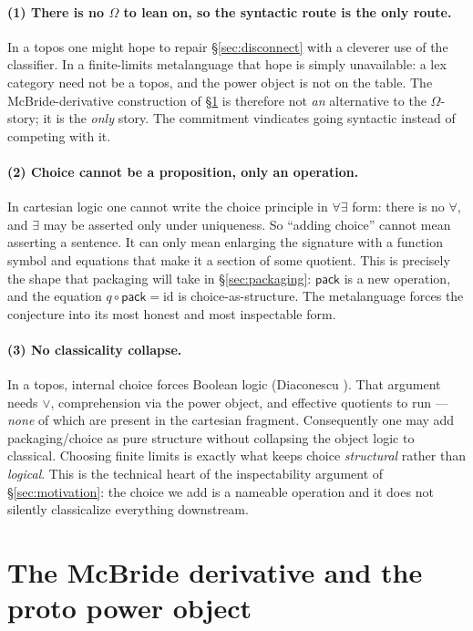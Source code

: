 \documentclass[11pt]{article}
\theoremstyle{definition}
\theoremstyle{plain}
\newcommand{\pack}{\mathsf{pack}}
\newcommand{\id}{\mathrm{id}}
\newcommand{\qmap}{q}
\begin{document}
\paragraph{(1) There is no $\Omega$ to lean on, so the syntactic route is the
only route.} In a topos one might hope to repair \S\ref{sec:disconnect} with a
cleverer use of the classifier. In a finite-limits metalanguage that hope is
simply unavailable: a lex category need not be a topos, and the power object
is not on the table. The McBride-derivative construction of
\S\ref{sec:derivative} is therefore not \emph{an} alternative to the
$\Omega$-story; it is the \emph{only} story. The commitment vindicates going
syntactic instead of competing with it.

\paragraph{(2) Choice cannot be a proposition, only an operation.} In
cartesian logic one cannot write the choice principle in $\forall\exists$
form: there is no $\forall$, and $\exists$ may be asserted only under
uniqueness. So ``adding choice'' cannot mean asserting a sentence. It can only
mean enlarging the signature with a function symbol and equations that make it
a section of some quotient. This is precisely the shape that packaging will
take in \S\ref{sec:packaging}: $\pack$ is a new operation, and the equation
$\qmap \circ \pack = \id$ is choice-as-structure. The metalanguage forces the
conjecture into its most honest and most inspectable form.

\paragraph{(3) No classicality collapse.} In a topos, internal choice forces
Boolean logic (Diaconescu \cite{Diaconescu75,MacLaneMoerdijk92}). That
argument needs $\vee$, comprehension via the power object, and effective
quotients to run --- \emph{none} of which are present in the cartesian
fragment. Consequently one may add packaging/choice as pure structure without
collapsing the object logic to classical. Choosing finite limits is exactly
what keeps choice \emph{structural} rather than \emph{logical}. This is the
technical heart of the inspectability argument of \S\ref{sec:motivation}: the
choice we add is a nameable operation and it does not silently classicalize
everything downstream.

\section{The McBride derivative and the proto power object}
\label{sec:derivative}
\end{document}
